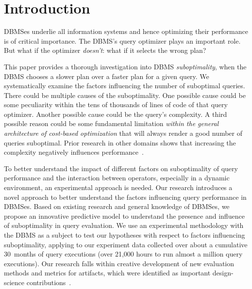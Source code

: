 \documentclass[prodmode,acmtods]{acmsmall}
\begin{document}
\section{Introduction}
DBMSes underlie all information systems and hence optimizing their performance is of
critical importance. The DBMS's query optimizer plays an important role. But
what if the optimizer {\em doesn't}: what if it selects the wrong plan?

This paper provides a thorough investigation into \hbox{DBMS} {\em suboptimality},
when the \hbox{DBMS} chooses a slower plan over a faster plan for a given query. We systematically examine the factors influencing the number of suboptimal
queries. There could be multiple causes of the suboptimality. One possible
cause could be some peculiarity within the tens of thousands of lines of
code of that query optimizer. Another possible cause could be the query's
complexity. A third possible reason could be some fundamental limitation
{\em within the general architecture of cost-based optimization} that will
always render a good number of queries suboptimal. Prior research in other domains shows that
increasing the complexity negatively influences
performance~\cite{campbell88,moody98}.

To better understand the impact of different factors on suboptimality of
query performance and the interaction between operators, especially in a
dynamic environment, an experimental approach is needed.
Our research introduces a novel approach
to better understand the factors influencing query performance in
\hbox{DBMSes}. Based on existing research and general knowledge of \hbox{DBMSes}, we
propose an innovative predictive model to understand the presence and influence
of suboptimality in query evaluation. We use an experimental methodology with
the \hbox{DBMS} as a subject to test our hypotheses with respect to factors
influencing suboptimality, applying to 
our experiment data collected over about a \hbox{cumulative} 30~months of query
executions (over 21,000 hours to run almost a million query
executions).
Our research falls within creative development of
new evaluation methods and metrics for artifacts, which were identified as
important design-science contributions~\cite{hevner04}.
\end{document}
